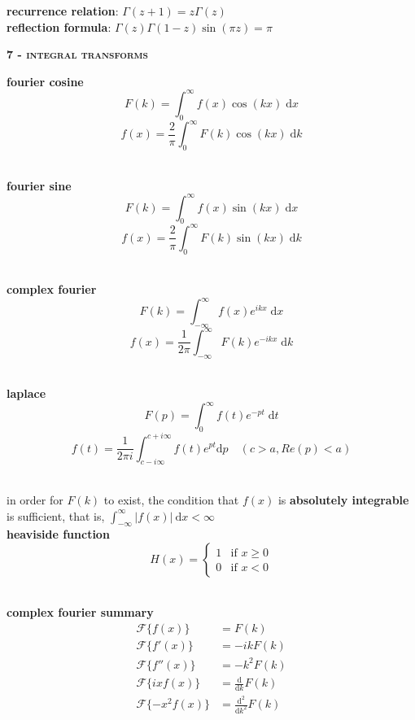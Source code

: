 \documentclass[a4paper]{article}
\newcommand\abs[1]{\ensuremath{\lvert#1\rvert}}
\begin{document}
\begin{multicols}{2}
\begin{framed}
	\noindent
	\textbf{recurrence relation}: $\Gamma(z + 1) = z\Gamma(z)$\\
	\textbf{reflection formula}: $\Gamma(z)\Gamma(1-z)\sin(\pi z) = \pi$
\end{framed}

\begin{framed}
	\begin{center}
		\textbf{\textsc{7 - integral transforms}}
	\end{center}
	
	\noindent
	\textbf{fourier cosine}\\
	$$F(k) = \int_0^\infty f(x) \cos(kx) \; \mathrm{d}x$$
	$$f(x) = \frac{2}{\pi} \int_0^\infty F(k) \cos(kx) \; \mathrm{d}k$$\
	
	\noindent
	\textbf{fourier sine}\\
	$$F(k) = \int_0^\infty f(x) \sin(kx) \; \mathrm{d}x$$
	$$f(x) = \frac{2}{\pi} \int_0^\infty F(k) \sin(kx) \; \mathrm{d}k$$\
	
	\noindent
	\textbf{complex fourier}\\
	$$F(k) = \int_{-\infty}^\infty f(x)e^{ikx} \; \mathrm{d}x$$
	$$f(x) = \frac{1}{2\pi} \int_{-\infty}^\infty F(k) e^{-ikx} \; \mathrm{d}k$$\
	
	\noindent
	\textbf{laplace}\\
	$$F(p) = \int_0^\infty f(t)e^{-pt} \; \mathrm{d}t$$
	$$f(t) = \frac{1}{2\pi i} \int_{c - i\infty}^{c + i\infty} f(t) e^{pt} \mathrm{d}p \quad (c > a, Re(p) < a)$$\
	
	\noindent
	in order for $F(k)$ to exist, the condition that $f(x)$ is \textbf{absolutely integrable} is sufficient, that is, $\int^\infty_{-\infty} \abs{f(x)} \:\mathrm{d}x< \infty$\\
	
	\noindent
	\textbf{heaviside function} $$H(x) = \begin{cases} 1 & \text{if $x \geq 0$}\\ 0 & \text{if $x < 0$}\end{cases}$$\
	
	\noindent
	\textbf{complex fourier summary}
	\begin{align*}
		\mathcal{F}\{f(x)\} & = F(k)	\\
		\mathcal{F}\{f'(x)\} & = -ikF(k)\\
		\mathcal{F}\{f''(x)\} & = -k^2F(k)\\
		\mathcal{F}\{ixf(x)\} & = \frac{\mathrm{d}}{\mathrm{d}k} F(k)\\
		\mathcal{F}\{-x^2f(x)\} & = \frac{\mathrm{d}^2}{\mathrm{d}k^2} F(k)
	\end{align*}


\end{framed}
\end{multicols}
\end{document}
